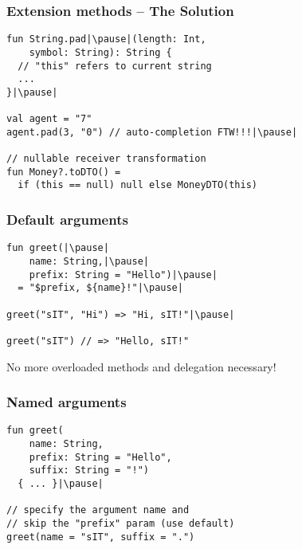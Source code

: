 \begin{frame}[fragile] \frametitle{Extension methods -- The Solution}
\pause
\begin{lstlisting}
fun String.pad|\pause|(length: Int,
    symbol: String): String {
  // "this" refers to current string
  ...
}|\pause|

val agent = "7"
agent.pad(3, "0") // auto-completion FTW!!!|\pause|

// nullable receiver transformation
fun Money?.toDTO() =
  if (this == null) null else MoneyDTO(this)
\end{lstlisting}
\end{frame}



\begin{frame}[fragile] \frametitle{Default arguments}
\pause
\begin{lstlisting}
fun greet(|\pause|
    name: String,|\pause|
    prefix: String = "Hello")|\pause|
  = "$prefix, ${name}!"|\pause|

greet("sIT", "Hi") => "Hi, sIT!"|\pause|

greet("sIT") // => "Hello, sIT!"
\end{lstlisting}

No more overloaded methods and delegation necessary!
\end{frame}


\begin{frame}[fragile] \frametitle{Named arguments}
\pause
\begin{lstlisting}
fun greet(
    name: String,
    prefix: String = "Hello",
    suffix: String = "!")
  { ... }|\pause|

// specify the argument name and
// skip the "prefix" param (use default)
greet(name = "sIT", suffix = ".")
\end{lstlisting}
\end{frame}


